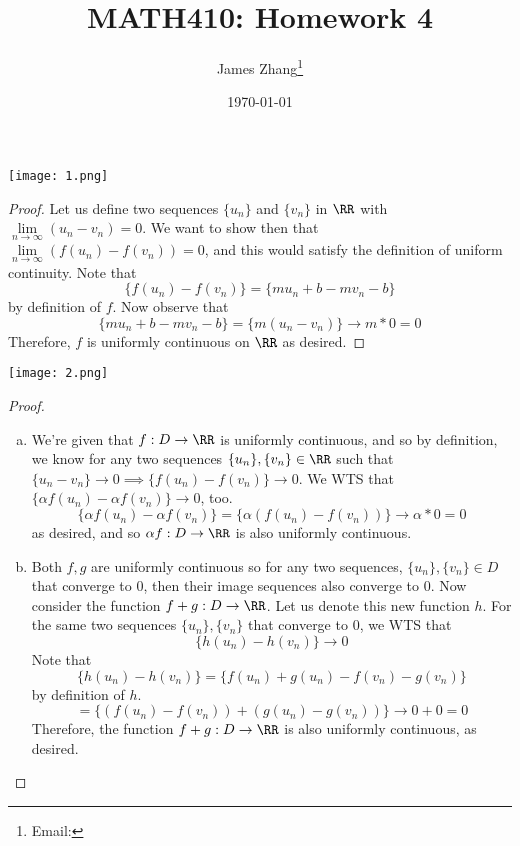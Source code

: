\documentclass[12pt]{scrartcl}
\newcommand{\Lim}{\underset{n\to\infty}{\lim}}
\begin{document}
\title{MATH410: Homework 4}
\author{James Zhang\thanks{Email: }}
\date{\today}



\maketitle

\texttt{[image: 1.png]}

\begin{proof}
  
Let us define two sequences $\{u_n\}$ and $\{v_n\}$ 
in $\RR$ with $\Lim (u_n - v_n) = 0$. We want to show then  that $\Lim (f(u_n) - f(v_n)) = 0$,
and this would satisfy the definition of uniform continuity.
Note that 
\[\{f(u_n) - f(v_n)\} = \{mu_n + b - mv_n - b\}\]
by definition of $f$. Now observe that 
\[\{mu_n + b - mv_n - b\} = \{m(u_n - v_n)\} \to m * 0 = 0\]
Therefore, $f$ is uniformly continuous on $\RR$ as desired. 

\end{proof}
\newpage 

\texttt{[image: 2.png]}

\begin{proof}
  
  \hfill

\begin{enumerate}[a.]

\item We're given that $f: D \to \RR$ is uniformly continuous, and so by definition, we know 
for any two sequences $\{u_n\}, \{v_n\} \in \RR$ such that $\{u_n - v_n\} \to 0 \implies \{f(u_n) - f(v_n)\} \to 0$. 
We WTS that $\{\alpha f(u_n) - \alpha f(v_n)\} \to 0$, too. 
\[\{\alpha f(u_n) - \alpha f(v_n)\} = \{\alpha(f(u_n) - f(v_n))\} \to \alpha * 0 = 0\]
as desired, and so $\alpha f: D\to\RR$ is also uniformly continuous. 

\item Both $f, g$ are uniformly continuous so for any two sequences, $\{u_n\}, \{v_n\} \in D$ 
that converge to $0$, then their image sequences also converge to $0$. Now consider the 
function $f + g: D \to \RR$. Let us denote this new function $h$. For the same 
two sequences $\{u_n\}, \{v_n\}$ that converge to $0$, we WTS that
\[\{h(u_n) - h(v_n)\} \to 0\]
Note that 
\[\{h(u_n) - h(v_n)\} = \{f(u_n) + g(u_n) - f(v_n) - g(v_n)\}\]
by definition of $h$. 
\[= \{(f(u_n) - f(v_n)) + (g(u_n) - g(v_n))\} \to 0 + 0 = 0\]
Therefore, the function $f + g: D \to \RR$ is also uniformly continuous, as desired.

\end{enumerate}
\end{proof}
\newpage 
\end{document}
